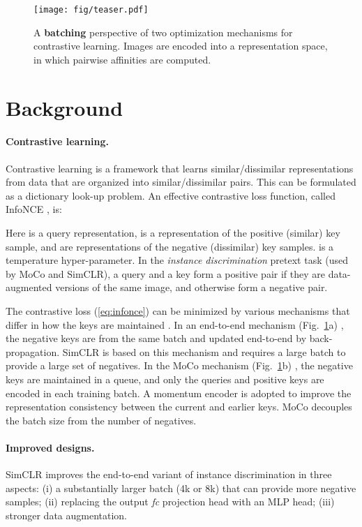 \documentclass[10pt,twocolumn,letterpaper]{article}
\begin{document}
\begin{figure}[t]
\centering
\texttt{[image: fig/teaser.pdf]}
\caption{A \textbf{batching} perspective of two optimization mechanisms for contrastive learning. Images are encoded into a representation space, in which pairwise affinities are computed.
\label{fig:teaser}
}
\end{figure}


\section{Background}

\paragraph{Contrastive learning.}

Contrastive learning \cite{Hadsell2006} is a framework that learns similar/dissimilar representations from data that are organized into similar/dissimilar pairs.
This can be formulated as a dictionary look-up problem. An effective contrastive loss function, called InfoNCE \cite{Oord2018}, is:

Here  is a query representation,  is a representation of the positive (similar) key sample, and  are representations of the negative (dissimilar) key samples.  is a temperature hyper-parameter.
In the \emph{instance discrimination} pretext task \cite{Wu2018a} (used by MoCo and SimCLR),
a query and a key form a positive pair if they are data-augmented versions of the same image, and otherwise form a negative pair.

The contrastive loss (\ref{eq:infonce}) can be minimized by various mechanisms that differ in how the keys are maintained \cite{He2019a}. In an end-to-end mechanism (Fig.~\ref{fig:teaser}a) \cite{Oord2018,Hjelm2019,Ye2019,Bachman2019,Henaff2019,Chen2020}, the negative keys are from the same batch and updated end-to-end by back-propagation.
SimCLR \cite{Chen2020} is based on this mechanism and requires a large batch to provide a large set of negatives.
In the MoCo mechanism (Fig.~\ref{fig:teaser}b) \cite{He2019a}, the negative keys are maintained in a queue, and only the queries and positive keys are encoded in each training batch. A momentum encoder is adopted to improve the representation consistency between the current and earlier keys. MoCo decouples the batch size from the number of negatives.

\paragraph{Improved designs.}
SimCLR \cite{Chen2020} improves the end-to-end variant of instance discrimination in three aspects: (i) a substantially larger batch (4k or 8k) that can provide more negative samples; (ii) replacing the output \emph{fc} projection head \cite{Wu2018a} with an MLP head; (iii) stronger data augmentation.
\end{document}
